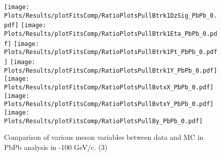 \begin{figure}[h]
\begin{center}
\texttt{[image: Plots/Results/plotFitsComp/RatioPlotsPullBtrk1DzSig\_PbPb\_0.pdf]}
\texttt{[image: Plots/Results/plotFitsComp/RatioPlotsPullBtrk1Eta\_PbPb\_0.pdf]}
\texttt{[image: Plots/Results/plotFitsComp/RatioPlotsPullBtrk1Pt\_PbPb\_0.pdf]}
\texttt{[image: Plots/Results/plotFitsComp/RatioPlotsPullBtrk1Y\_PbPb\_0.pdf]}
\texttt{[image: Plots/Results/plotFitsComp/RatioPlotsPullBvtxX\_PbPb\_0.pdf]}
\texttt{[image: Plots/Results/plotFitsComp/RatioPlotsPullBvtxY\_PbPb\_0.pdf]}
\texttt{[image: Plots/Results/plotFitsComp/RatioPlotsPullBy\_PbPb\_0.pdf]}
\caption{
Comparison of various \Bplus meson variables between data and MC in PbPb analysis in -100 GeV/c. (3)}
\label{fig:DataMCComparisonPbPb3}
\end{center}
\end{figure}

\fi

\clearpage
